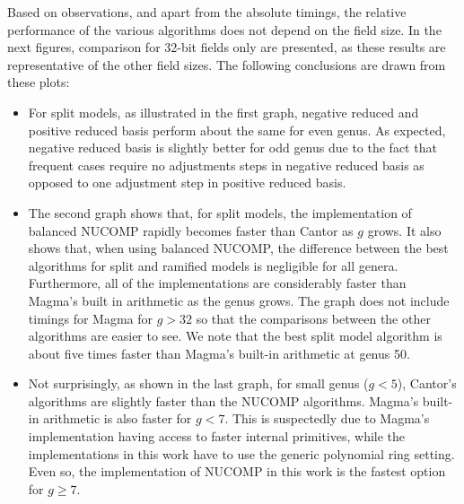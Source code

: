 Based on observations, and apart from the absolute timings, the relative
performance of the various algorithms does not depend on the field size. In the
next figures, comparison for 32-bit fields only are presented, as these results
are representative of the other field sizes. The following conclusions are drawn
from these plots:
\begin{itemize}
    \item For split models, as illustrated in the first graph, negative
    reduced and positive reduced basis perform about the same for even genus. As
    expected, negative reduced basis is slightly better for odd genus due to the
    fact that frequent cases require no adjustments steps in negative reduced
    basis as opposed to one adjustment step in positive reduced basis.
     
    \item The second graph shows that, for split models, the implementation of
    balanced NUCOMP rapidly becomes faster than Cantor as $g$ grows.  It also
    shows that, when using balanced NUCOMP, the difference between the best
    algorithms for split and ramified models is negligible for all genera.
    Furthermore, all of the implementations are considerably faster than Magma's
    built in arithmetic as the genus grows. The graph does not include timings
    for Magma for $g>32$ so that the comparisons between the other algorithms
    are easier to see.  We note that the best split model algorithm is about
    five times faster than Magma's built-in arithmetic at genus 50.

    \item Not surprisingly, as shown in the last graph, for small genus ($g <
    5$), Cantor's algorithms are slightly faster than the NUCOMP algorithms.
    Magma's built-in arithmetic is also faster for $g < 7$. This is suspectedly
    due to Magma's implementation having access to faster internal primitives,
    while the implementations in this work have to use the generic polynomial
    ring setting. Even so, the implementation of NUCOMP in this work is the
    fastest option for $g \geq 7$.
\end{itemize}


